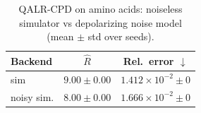 \begin{table}[t]
\centering
\caption{QALR-CPD on amino acids: noiseless simulator vs depolarizing noise model (mean $\pm$ std over seeds).}
\label{tab:ablation_ibm}
\begin{tabular}{@{}lcc@{}}
\toprule
Backend & \(\hat R\) & Rel.\ error \(\downarrow\) \\
\midrule
sim & \(9.00 \pm 0.00\) & \(1.412{\times}10^{-2} \pm 0\) \\
noisy sim. & \(8.00 \pm 0.00\) & \(1.666{\times}10^{-2} \pm 0\) \\
\bottomrule
\end{tabular}
\end{table}